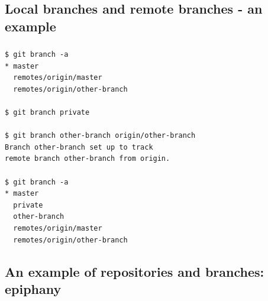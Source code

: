 \subsection{Local branches and remote branches - an example}
\begin{frame}[fragile]
  \frametitle{\insertsubsection}

  \begin{small}
\begin{verbatim}
$ git branch -a
* master
  remotes/origin/master
  remotes/origin/other-branch

$ git branch private

$ git branch other-branch origin/other-branch
Branch other-branch set up to track
remote branch other-branch from origin.

$ git branch -a
* master
  private
  other-branch
  remotes/origin/master
  remotes/origin/other-branch
\end{verbatim}
  \end{small}

\end{frame}


\subsection{An example of repositories and branches: epiphany}

